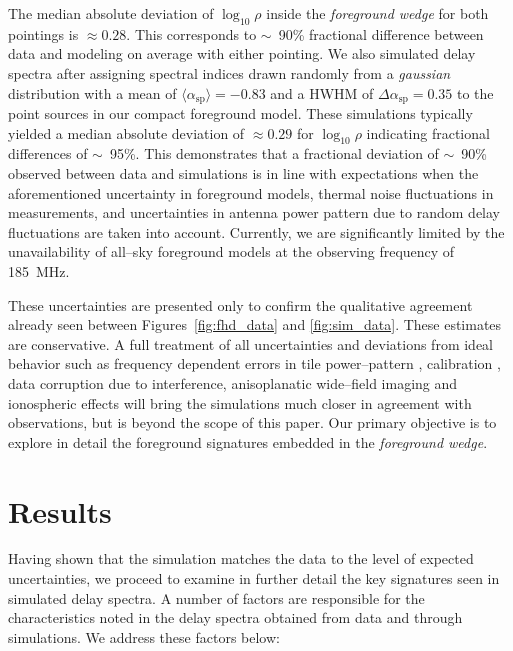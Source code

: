 \documentclass[preprint2,iop,numberedappendix]{emulateapj}
\begin{document}
The median absolute deviation of $\log_{10}\rho$ inside the {\it foreground wedge} for both pointings is $\approx 0.28$. This corresponds to $\sim$~90\% fractional difference between data and modeling on average with either pointing. We also simulated delay spectra after assigning spectral indices drawn randomly from a {\it gaussian} distribution with a mean of $\langle\alpha_\textrm{sp}\rangle=-0.83$ and a HWHM of $\Delta\alpha_\textrm{sp}=0.35$ to the point sources in our compact foreground model. These simulations typically yielded a median absolute deviation of $\approx 0.29$ for $\log_{10}\rho$ indicating fractional differences of $\sim$~95\%. This demonstrates that a fractional deviation of $\sim$~90\% observed between data and simulations is in line with expectations when the aforementioned uncertainty in foreground models, thermal noise fluctuations in measurements, and uncertainties in antenna power pattern due to random delay fluctuations are taken into account. Currently, we are significantly limited by the unavailability of all--sky foreground models at the observing frequency of 185~MHz. 

These uncertainties are presented only to confirm the qualitative agreement already seen between Figures~\ref{fig:fhd_data} and \ref{fig:sim_data}. These estimates are conservative. A full treatment of all uncertainties and deviations from ideal behavior such as frequency dependent errors in tile power--pattern \citep{ber14}, calibration \citep{dat10}, data corruption due to interference, anisoplanatic wide--field imaging and ionospheric effects \citep{int09} will bring the simulations much closer in agreement with observations, but is beyond the scope of this paper. Our primary objective is to explore in detail the foreground signatures embedded in the {\it foreground wedge}.

\section{Results}\label{sec:delay-spectrum-analysis}

Having shown that the simulation matches the data to the level of expected uncertainties, we proceed to examine in further detail the key signatures seen in simulated delay spectra. A number of factors are responsible for the characteristics noted in the delay spectra obtained from data and through simulations. We address these factors below: 
\end{document}
